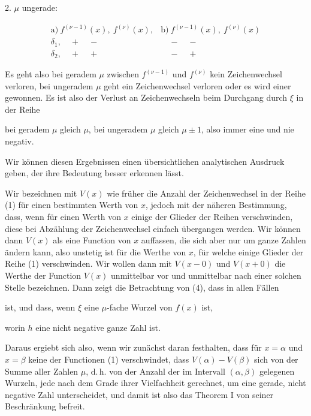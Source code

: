 
2. $\mu$ ungerade:

\[
\begin{array}{ll}
\text{a)}\ f^{(\nu-1)}(x),\ f^{(\nu)}(x), & \text{b)}\ f^{(\nu-1)}(x),\ f^{(\nu)}(x) \\[2pt]
\delta_1,\quad + \quad - & \quad - \quad - \\[2pt]
\delta_2,\quad + \quad + & \quad - \quad +
\end{array}
\]

Es geht also bei geradem $\mu$ zwischen $f^{(\nu-1)}$ und $f^{(\nu)}$ kein Zeichenwechsel verloren, bei ungeradem $\mu$ geht ein Zeichenwechsel verloren oder es wird einer gewonnen. Es ist also der Verlust an Zeichenwechseln beim Durchgang durch $\xi$ in der Reihe


bei geradem $\mu$ gleich $\mu$, bei ungeradem $\mu$ gleich $\mu \pm 1$, also immer eine  und nie negativ.

Wir können diesen Ergebnissen einen übersichtlichen analytischen Ausdruck geben, der ihre Bedeutung besser erkennen lässt.

Wir bezeichnen mit $V(x)$ wie früher die Anzahl der Zeichenwechsel in der Reihe (1) für einen bestimmten Werth von $x$, jedoch mit der näheren Bestimmung, dass, wenn für einen Werth von $x$ einige der Glieder der Reihen verschwinden, diese bei Abzählung der Zeichenwechsel einfach übergangen werden. Wir können dann $V(x)$ als eine Function von $x$ auffassen, die sich aber nur um ganze Zahlen ändern kann, also unstetig ist für die Werthe von $x$, für welche einige Glieder der Reihe (1) verschwinden. Wir wollen dann mit $V(x-0)$ und $V(x+0)$ die Werthe der Function $V(x)$ unmittelbar vor und unmittelbar nach einer solchen Stelle bezeichnen. Dann zeigt die Betrachtung von (4), dass in allen Fällen


ist, und dass, wenn $\xi$ eine $\mu$-fache Wurzel von $f(x)$ ist,


worin $h$ eine nicht negative ganze Zahl ist.

Daraus ergiebt sich also, wenn wir zunächst daran festhalten, dass für $x = \alpha$ und $x = \beta$ keine der Functionen (1) verschwindet, dass $V(\alpha) - V(\beta)$ sich von der Summe aller Zahlen $\mu$, d.\,h. von der Anzahl der im Intervall $(\alpha, \beta)$ gelegenen Wurzeln, jede nach dem Grade ihrer Vielfachheit gerechnet, um eine gerade, nicht negative Zahl unterscheidet, und damit ist also das Theorem I von seiner Beschränkung befreit.
